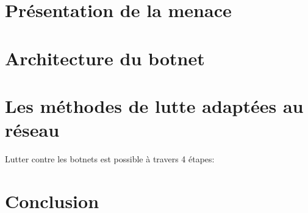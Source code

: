 

\section{Présentation de la menace}






\section{Architecture du botnet}






\section{Les méthodes de lutte adaptées au réseau}
Lutter contre les botnets est possible à travers 4 étapes:






\section{Conclusion}
 

